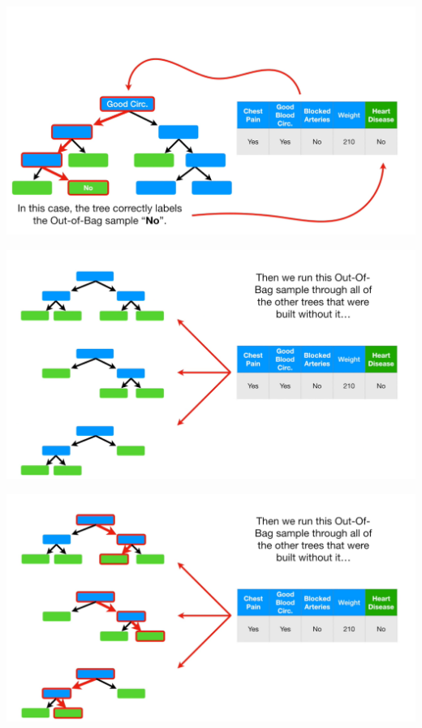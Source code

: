 \documentclass[
  ignorenonframetext,
]{beamer}
\begin{document}
\begin{frame}{}
\protect\hypertarget{section-74}{}
\includegraphics{images/r75.png}
\end{frame}

\begin{frame}{}
\protect\hypertarget{section-75}{}
\includegraphics{images/r76.png}
\end{frame}

\begin{frame}{}
\protect\hypertarget{section-76}{}
\includegraphics{images/r77.png}
\end{frame}
\end{document}
